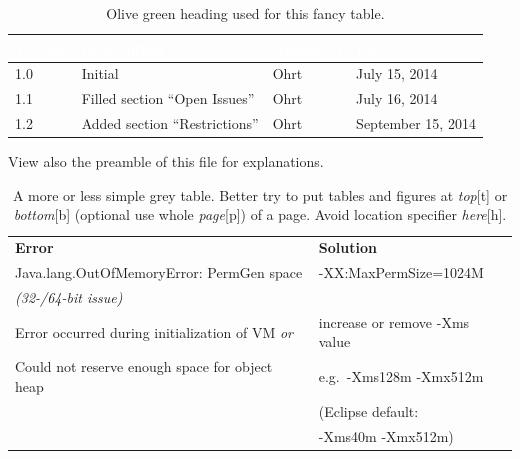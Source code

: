 \begin{center}
  \begin{table}[tbp]
    \begin{tabular}{|l|l|l|l|}\hline
      \rowcolor{olivegreen30}
      \textcolor{white}{\textbf{Version}}
      	 &\textcolor{white}{\textbf{Description}}	
      	   &	\textcolor{white}{\textbf{Author(s)}}	
      	     &\textcolor{white}{\textbf{Date}}\\
      \hline
      1.0	
        & Initial				
          & Ohrt					
            & July 15, 2014\\
      \hline
      1.1	
        & Filled section ``Open Issues''	
          & Ohrt					
            & July 16, 2014\\
      \hline
      1.2	
        & Added section ``Restrictions''	
          & Ohrt					
            & September 15, 2014\\
      \hline
    \end{tabular}
    \caption{Olive green heading used for this fancy table.}
    \label{tab:olive}
  \end{table}
\end{center} 
  
View also the preamble of this file for explanations.
  
\begin{center} 
  \begin{table}[tbp]
    \begin{tabular}{ l | l }
      \rowcolor{gray20}\textbf{Error}	
        & \textbf{Solution} \\
      \rowcolor{gray5}Java.lang.OutOfMemoryError: PermGen space
        & -XX:MaxPermSize=1024M \\
      \rowcolor{gray5}\textit{(32-/64-bit issue)}
      	& \\
      \rowcolor{gray20}Error occurred during initialization of VM \textit{or}
      	& increase or remove -Xms value \\
      \rowcolor{gray20}Could not reserve enough space for object heap
      	& e.g.\ -Xms128m -Xmx512m \\
      \rowcolor{gray20}					
        & \small{(Eclipse default:}\\
      \rowcolor{gray20}					
        & \small{-Xms40m -Xmx512m)} \\
    \end{tabular}
    \caption{A more or less simple grey table. Better try to put tables and figures at \textit{top}[t] or \textit{bottom}[b] (optional use whole \textit{page}[p]) of a page. Avoid location specifier \textit{here}[h].}
    \label{tab:grey}
  \end{table}
\end{center}



